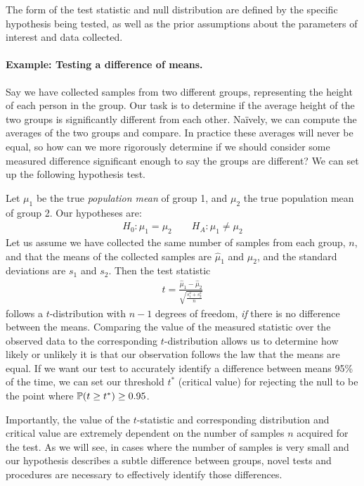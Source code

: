 The form of the test statistic and null distribution
are defined by the specific hypothesis being tested,
as well as the prior assumptions about the parameters
of interest and data collected.

\paragraph{Example: Testing a difference of means.} 
Say we have collected samples from two different groups,
representing the height of each person in the group.
Our task is to determine if the average height
of the two groups is significantly different from each other.
Na\"ively, we can compute the averages of the two groups and compare.
In practice these averages will never be equal, so how can we 
more rigorously determine if we should consider some measured difference
significant enough to say the groups are different?
We can set up the following hypothesis test.

Let $\mu_1$ be the true \textit{population mean} of group 1,
and $\mu_2$ the true population mean of group 2.
Our hypotheses are:
\begin{align}
H_0: \mu_1 = \mu_2 \qquad H_A: \mu_1 \neq \mu_2
\end{align}
Let us assume we have collected the same number of samples from each group,
$n$, and that the means of the collected samples are $\hat{\mu}_1$ and $\hat{\mu}_2$,
and the standard deviations are $s_1$ and $s_2$.
Then the test statistic
\begin{align}
t = \frac{\hat{\mu}_1 - \hat{\mu}_2}{\sqrt{\frac{s_1^2 + s_2^2}{n}}}
\end{align}
follows a $t$-distribution with $n-1$ degrees of freedom,
\textit{if} there is no difference between the means.
Comparing the value of the measured statistic over the observed data
to the corresponding $t$-distribution allows
us to determine how likely or unlikely it is that 
our observation follows the law that the means are equal.
If we want our test to accurately identify
a difference between means 95\% of the time,
we can set our threshold $t^*$ (critical value) for rejecting the null
to be the point where $\mathbb{P}(t \geq t^*) \geq 0.95$.

Importantly, the value of the $t$-statistic and corresponding
distribution and critical value are extremely
dependent on the number of samples $n$ acquired for the test.
As we will see, in cases where the number of samples is 
very small and our hypothesis describes 
a subtle difference between groups,
novel tests and procedures are necessary
to effectively identify those differences.

